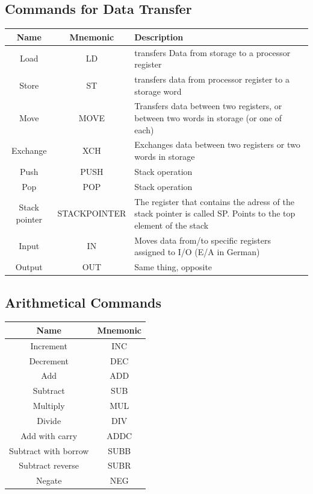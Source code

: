 \documentclass{article}
\begin{document}
\subsection{Commands for Data Transfer}

\begin{center}
  \begin{tabular}{ |c|c|p{8cm}| } 
  \hline
  Name & Mnemonic & Description \\ 
  \hline
  Load & LD & transfers Data from storage to a processor register \\ 
  \hline
  Store & ST & transfers data from processor register to a storage word \\ 
  \hline
  Move & MOVE & Transfers data between two registers, or between two words in storage (or one of each)  \\ 
  \hline
  Exchange & XCH & Exchanges data between two registers or two words in storage \\ 
  \hline
  Push & PUSH & Stack operation \\ 
  \hline
  Pop & POP & Stack operation \\ 
  \hline
  Stack pointer & STACKPOINTER & The register that contains the adress of the stack pointer is called SP. Points to the top element of the stack \\ 
  \hline
  Input & IN &  Moves data from/to specific registers assigned to I/O (E/A in German) \\ 
  \hline
  Output & OUT & Same thing, opposite\\ 
  \hline
  \end{tabular}
\end{center}

\subsection{Arithmetical Commands}

\begin{center}
  \begin{tabular}{ |c|c|} 
  \hline
  Name & Mnemonic  \\ 
  \hline
  Increment & INC \\
  \hline
  Decrement & DEC \\
  \hline
  Add & ADD \\
  \hline
  Subtract & SUB \\
  \hline
  Multiply & MUL \\
  \hline
  Divide & DIV \\
  \hline
  Add with carry & ADDC \\
  \hline
  Subtract with borrow& SUBB \\
  \hline
  Subtract reverse & SUBR \\
  \hline
  Negate & NEG \\
  \hline
  \end{tabular}
\end{center}
\end{document}
